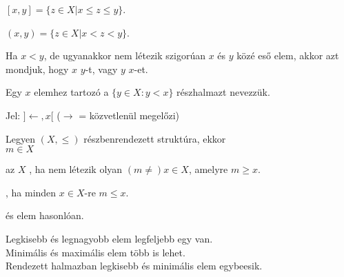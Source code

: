 \begin{frame}
\begin{tcolorbox}[title={Def.: Zárt Intervallum}]
$[x, y] = \{ z \in X | x \leq z \leq y \}$.
\end{tcolorbox}

\begin{tcolorbox}[title={Def.: Nyílt Intervallum}]
$(x, y) = \{ z \in X | x < z < y \}$.
\end{tcolorbox}

\begin{tcolorbox}[title={Def.: Közvetlenü megelőzi, Közvetlenül követi}]
Ha $x < y$, de ugyanakkor nem létezik szigorúan $x$ és $y$ közé eső elem, akkor azt mondjuk, hogy $x$  $y$-t, vagy $y$  $x$-et.\\
\mmedskip

Egy $x$ elemhez tartozó  a $\{ y \in X : y < x \}$ részhalmazt nevezzük.\\
\mmedskip

Jel: $] {\leftarrow}, x [$ ($\rightarrow$ = közvetlenül megelőzi)
\end{tcolorbox}

\begin{tcolorbox}[title={Def.: Minimális, Maximális, Legkisebb, Legnagyobb elem}]
Legyen $(X, {\leq})$ részbenrendezett struktúra, ekkor\\
$m \in X$\\
\msmallskip

az $X$ , ha nem létezik olyan $(m {\neq}) x \in X$, amelyre $m \geq x$.\\
\mmedskip

, ha minden $x \in X$-re $m \leq x$.\\
\mmedskip

 és  elem hasonlóan.
\end{tcolorbox}

\begin{tcolorbox}[title={Ész}]
Legkisebb és legnagyobb elem legfeljebb egy van.\\
Minimális és maximális elem több is lehet.\\
Rendezett halmazban legkisebb és minimális elem egybeesik.
\end{tcolorbox}
\end{frame}


